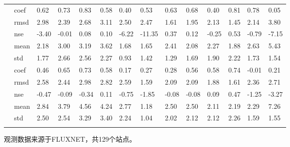 \begin{table}
\begin{threeparttable}
\begin{tabular}{l|l|llllllllllll}
            & coef & 0.62 & 0.73 & 0.83 & 0.58 & 0.40 & 0.53 & 0.63 & 0.68 & 0.40 & 0.81 & 0.78 & 0.05 \\
            & rmsd & 2.98 & 2.39 & 2.68 & 3.11 & 2.50 & 2.47 & 1.61 & 1.95 & 2.13 & 1.45 & 2.14 & 3.80 \\
            & nse & -3.40 & -0.01 & 0.08 & 0.10 & -6.22 & -11.35 & 0.37 & 0.12 & -0.25 & 0.53 & -0.79 & -7.15 \\
            \hline
            \parbox[t]{1mm}{} & mean & 2.18 & 3.00 & 3.19 & 3.62 & 1.68 & 1.65 & 2.41 & 2.08 & 2.27 & 1.88 & 2.63 & 5.43 \\
            & std & 1.77 & 2.66 & 2.56 & 2.27 & 0.93 & 1.42 & 1.29 & 1.69 & 1.90 & 2.22 & 1.73 & 1.54 \\
            & coef & 0.46 & 0.65 & 0.73 & 0.58 & 0.17 & 0.27 & 0.28 & 0.56 & 0.58 & 0.74 & -0.01 & 0.21 \\
            & rmsd & 2.58 & 2.44 & 2.98 & 2.82 & 2.59 & 1.59 & 2.09 & 2.09 & 1.88 & 1.61 & 2.36 & 2.71 \\
            & nse & -0.47 & -0.09 & -0.34 & 0.11 & -0.75 & -1.85 & -0.08 & -0.08 & 0.09 & 0.47 & -1.25 & -3.27 \\
            \hline
            \parbox[t]{1mm}{} & mean & 2.84 & 3.79 & 4.56 & 4.24 & 2.77 & 1.18 & 2.50 & 2.50 & 2.11 & 2.19 & 2.29 & 7.26 \\
            & std & 2.50 & 2.54 & 3.29 & 3.40 & 2.24 & 1.04 & 2.02 & 2.12 & 2.12 & 2.26 & 1.59 & 1.55 \\
            \Xhline{1.5pt}
        \end{tabular}
        \begin{tablenotes}
            \footnotesize
            \item 观测数据来源于FLUXNET，共129个站点。
        \end{tablenotes}
    \end{threeparttable}
\end{table}

